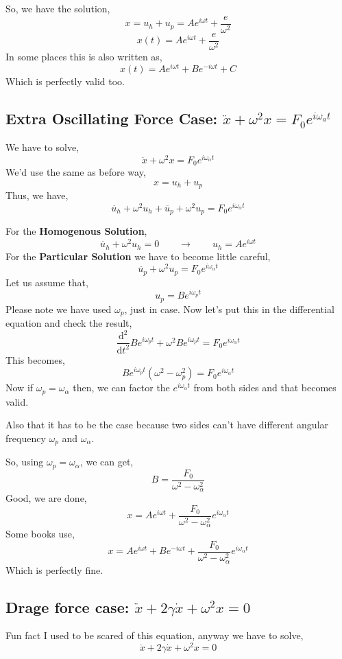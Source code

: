 \documentclass[11pt, a4paper]{memoir}
\begin{document}
So, we have the solution,
\[ 
x = u_{ h } + u_{ p} = Ae^{i \omega t} + \frac{e}{\omega^2}
\]
\[ 
    \boxed{ x\left( t \right)  = Ae^{i \omega t} + \frac{e}{\omega^2}}
\]
In some places this is also written as,
\[ 
    \boxed{ x\left( t \right) = Ae^{i \omega t} + Be^{- i \omega t}  + C}
\]
Which is perfectly valid too.

\subsection{ Extra Oscillating Force Case: $ \ddot{x} + \omega^2 x = F_0 e^{i \omega_{ a} t}$} 
We have to solve,
\[ 
\boxed{ \ddot{x } + \omega^2 x = F_0 e^{i \omega_{ \alpha} t}}
\]
We'd use the same as before way,
\[ 
\boxed{ x = u_{ h} + u_{ p}}
\]
Thus, we have,
\[ 
\ddot{u_{ h}} + \omega^2 u_{ h} + \ddot{u_{ p}} + \omega^2 u_{ p} = F_0 e^{i \omega_{ \alpha} t}
\] 

For the \textbf{Homogenous Solution}, 
\[ 
    \ddot{u_{ h} } + \omega^2 u_{ h} = 0 \quad \quad \to \quad \quad \boxed{ u_{ h} = Ae^{i \omega t} }
\]
For the \textbf{Particular Solution} we have to become little careful,
\[ 
\ddot{u_{ p}} + \omega^2 u_{ p} = F_0e^{i \omega_{ \alpha} t}
\]
Let us assume that,
\[ 
u_{ p} = Be^{i \omega_{ p} t}
\]
Please note we have used $\omega_{ p}$, just in case. Now let's put this in the differential equation and check the result,
\[ 
    \frac{\mathrm{d} ^2}{\mathrm{d} t^2} Be^{i \omega_{ p} t} + \omega^2 B e^{i \omega_{ p} t} = F_0 e^{i \omega_{ \alpha} t}
\]
This becomes,
\[ 
    Be^{i \omega_{ p} t } \left( \omega^2 - \omega^2_{ p} \right) = F_0e^{i \omega_{ \alpha} t}
\]
Now if $\omega_{ p} = \omega_{ \alpha}$ then, we can factor the $e^{ i \omega_{ \alpha} t} $ from both sides and that becomes valid. 

Also that it has to be the case because two sides can't have different angular frequency $\omega_{ p}$ and $\omega_{ \alpha}$.

So, using $\omega_{ p} = \omega_{ \alpha}$, we can get,
\[ 
B = \frac{F_0}{\omega^2 - \omega_{ \alpha}^2} 
\]
Good, we are done,
\[ 
\boxed{ x = Ae^{i\omega t} + \frac{F_0}{\omega^2 - \omega_{ \alpha}^2} e^{i \omega_{ \alpha} t}}
\]
Some books use,
\[\boxed{  
x = Ae^{i \omega t} + Be^{- i \omega t} + \frac{F_0}{\omega^2 - \omega_{ \alpha}^2} e^{i \omega_{ \alpha} t}}
\]
Which is perfectly fine. 

\subsection{ Drage force case: $ \ddot{x} + 2 \gamma \dot{x} + \omega^2 x = 0$}
Fun fact I used to be scared of this equation, anyway we have to solve,
\[ 
\ddot{x } + 2 \gamma \dot{x} + \omega^2 x = 0
\]
\end{document}
